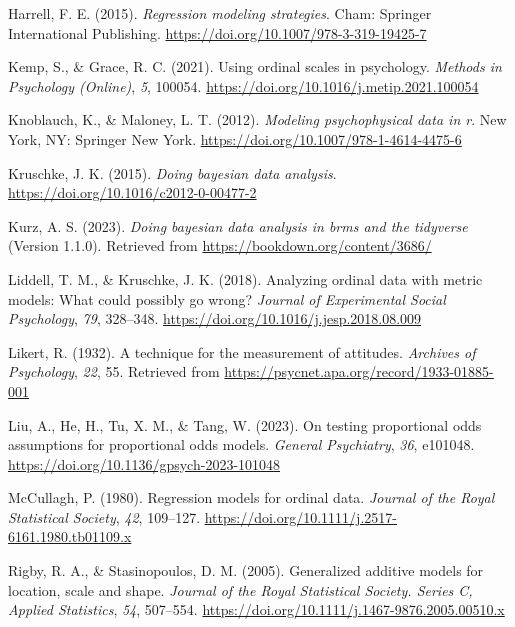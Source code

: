 \documentclass[
  man,floatsintext]{apa6}
\newlength{\cslhangindent}
\newenvironment{CSLReferences}[2] %
 {\begin{list}{}{%
  \setlength{\itemindent}{0pt}
  \setlength{\leftmargin}{0pt}
  \setlength{\parsep}{0pt}
  \ifodd #1
   \setlength{\leftmargin}{\cslhangindent}
   \setlength{\itemindent}{-1\cslhangindent}
  \fi
  \setlength{\itemsep}{#2\baselineskip}}}
 {\end{list}}
\begin{document}
\begin{CSLReferences}{1}{0}
Harrell, F. E. (2015). \emph{Regression modeling strategies}. Cham: Springer International Publishing. \url{https://doi.org/10.1007/978-3-319-19425-7}

Kemp, S., \& Grace, R. C. (2021). Using ordinal scales in psychology. \emph{Methods in Psychology (Online)}, \emph{5}, 100054. \url{https://doi.org/10.1016/j.metip.2021.100054}

Knoblauch, K., \& Maloney, L. T. (2012). \emph{Modeling psychophysical data in r}. New York, NY: Springer New York. \url{https://doi.org/10.1007/978-1-4614-4475-6}

Kruschke, J. K. (2015). \emph{Doing bayesian data analysis}. \url{https://doi.org/10.1016/c2012-0-00477-2}

Kurz, A. S. (2023). \emph{Doing bayesian data analysis in brms and the tidyverse} (Version 1.1.0). Retrieved from \url{https://bookdown.org/content/3686/}

Liddell, T. M., \& Kruschke, J. K. (2018). Analyzing ordinal data with metric models: What could possibly go wrong? \emph{Journal of Experimental Social Psychology}, \emph{79}, 328--348. \url{https://doi.org/10.1016/j.jesp.2018.08.009}

Likert, R. (1932). A technique for the measurement of attitudes. \emph{Archives of Psychology}, \emph{22}, 55. Retrieved from \url{https://psycnet.apa.org/record/1933-01885-001}

Liu, A., He, H., Tu, X. M., \& Tang, W. (2023). On testing proportional odds assumptions for proportional odds models. \emph{General Psychiatry}, \emph{36}, e101048. \url{https://doi.org/10.1136/gpsych-2023-101048}

McCullagh, P. (1980). Regression models for ordinal data. \emph{Journal of the Royal Statistical Society}, \emph{42}, 109--127. \url{https://doi.org/10.1111/j.2517-6161.1980.tb01109.x}

Rigby, R. A., \& Stasinopoulos, D. M. (2005). Generalized additive models for location, scale and shape. \emph{Journal of the Royal Statistical Society. Series C, Applied Statistics}, \emph{54}, 507--554. \url{https://doi.org/10.1111/j.1467-9876.2005.00510.x}


\end{CSLReferences}
\end{document}

